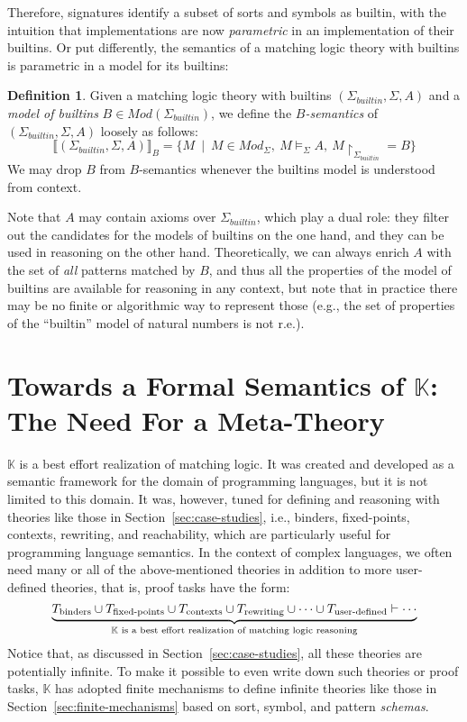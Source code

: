 \documentclass[UTF8,11pt]{article}
\newcounter{thmcounter}
\theoremstyle{plain}
\theoremstyle{definition}
\newtheorem{definition} [thmcounter]{Definition}
\theoremstyle{remark}
\newcommand{\K}{\mbox{$\mathbb{K}$}\xspace}
\newcommand{\Mod}{\textit{Mod}}
\newcommand{\denote}[1]{\llbracket{#1}\rrbracket}
\newcommand{\reduct}[2]{\mbox{${#1}\!\!\upharpoonright_{#2}$}}
\newcommand{\builtin}{\textit{builtin}}
\begin{document}
Therefore, signatures identify a subset of sorts and symbols as builtin,
with the intuition that implementations are now \emph{parametric} in an
implementation of their builtins.
Or put differently, the semantics of a matching logic theory with builtins
is parametric in a model for its builtins:

\begin{definition}
Given a matching logic theory with builtins $(\Sigma_\builtin,\Sigma,A)$ and
a \emph{model of builtins} $B \in \Mod(\Sigma_\builtin)$, we define
the \emph{$B$-semantics} of $(\Sigma_\builtin,\Sigma,A)$ loosely as follows:
$$
\denote{(\Sigma_\builtin,\Sigma,A)}_B = 
\{M \ \mid \ M \in \Mod_{\Sigma},\ M \models_{\Sigma} A,\ \reduct{M}{\Sigma_\builtin} = B \}
$$
We may drop $B$ from $B$-semantics whenever the builtins model is
understood from context.
\end{definition}

Note that $A$ may contain axioms over $\Sigma_\builtin$, which play a dual
role: they filter out the candidates for the models of builtins on the one
hand, and they can be used in reasoning on the other hand.
Theoretically, we can always enrich $A$ with the set of \emph{all} patterns
matched by $B$, and thus all the properties of the model of builtins are
available for reasoning in any context, but note that in practice there may
be no finite or algorithmic way to represent those
(e.g., the set of properties of the ``builtin'' model of natural numbers is
not r.e.).

\section{Towards a Formal Semantics of {\K}: The Need For a Meta-Theory}
\label{sec:meta-theory-reflection}

{\K} is a best effort realization of matching logic.
It was created and developed as a semantic framework for the domain
of programming languages, but it is not limited to this domain.
It was, however, tuned for defining and reasoning with theories like
those in Section~\ref{sec:case-studies}, i.e.,
binders, fixed-points, contexts, rewriting, and reachability, which
are particularly useful for programming language semantics.
In the context of complex languages, we often need many or all of the
above-mentioned theories in addition to more user-defined theories, that is,
proof tasks have the form:
$$
\underbrace{T_\textrm{binders} \cup
T_\textrm{fixed-points} \cup 
T_\textrm{contexts} \cup 
T_\textrm{rewriting} \cup 
\cdots \cup 
T_\textrm{user-defined} \vdash \cdots}_
\text{\K is a best effort realization of matching logic reasoning}
$$
Notice that, as discussed in Section~\ref{sec:case-studies}, all these
theories are potentially infinite.
To make it possible to even write down such theories or proof tasks,
\K has adopted finite mechanisms to define infinite theories like those in
Section~\ref{sec:finite-mechanisms} based on sort, symbol, and
pattern \emph{schemas}.
\end{document}
